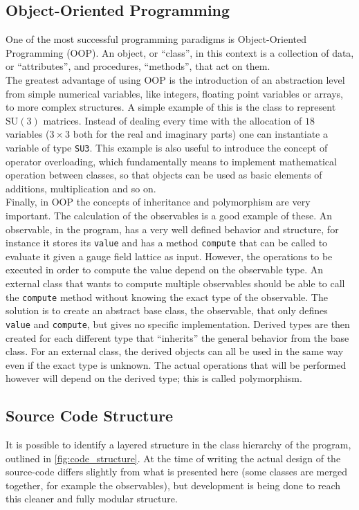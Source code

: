 \subsection{Object-Oriented Programming}
One of the most successful programming paradigms is Object-Oriented Programming (OOP). An object, or ``class'', in this context is a collection of data, or ``attributes'', and procedures, ``methods'', that act on them. \\
The greatest advantage of using OOP is the introduction of an abstraction level from simple numerical variables, like integers, floating point variables or arrays, to more complex structures. A simple example of this is the class to represent $\mathrm{SU}(3)$ matrices. Instead of dealing every time with the allocation of $18$ variables ($3\times 3$ both for the real and imaginary parts) one can instantiate a variable of type \texttt{SU3}. This example is also useful to introduce the concept of operator overloading, which fundamentally means to implement mathematical operation between classes, so that objects can be used as basic elements of additions, multiplication and so on.\\
Finally, in OOP the concepts of inheritance and polymorphism are very important. The calculation of the observables is a good example of these. An observable, in the program, has a very well defined behavior and structure, for instance it stores its \texttt{value} and has a method \texttt{compute} that can be called to evaluate it given a gauge field lattice as input. However, the operations to be executed in order to compute the value depend on the observable type. An external class that wants to compute multiple observables should be able to call the \texttt{compute} method without knowing the exact type of the observable. The solution is to create an abstract base class, the observable, that only defines \texttt{value} and \texttt{compute}, but gives no specific implementation. Derived types are then created for each different type that ``inherits'' the general behavior from the base class. For an external class, the derived objects can all be used in the same way even if the exact type is unknown. The actual operations that will be performed however will depend on the derived type; this is called polymorphism.\\

\subsection{Source Code Structure}
It is possible to identify a layered structure in the class hierarchy of the program, outlined in \cref{fig:code_structure}. At the time of writing the actual design of the source-code  differs slightly from what is presented here (some classes are merged together, for example the observables), but development is being done to reach this cleaner and fully modular structure.\\

